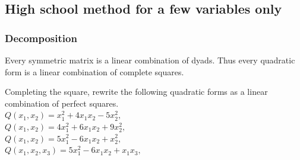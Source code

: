 \subsection{High school method for a few variables only}
\begin{frame}
    \frametitle{Decomposition}
    \begin{theorem}
        Every symmetric matrix is a linear combination of dyads. Thus
        every quadratic form is a linear combination of complete squares.
    \end{theorem}
\begin{example}
    Completing the square, rewrite the following quadratic forms as a linear combination of perfect squares.\\
    $Q\left( x_1,x_2 \right)=x_1^2+4x_1x_2-5x_2^2,$\\
    $Q\left( x_1,x_2 \right)=4x_1^2+6x_1x_2+9x_2^2,$\\
    $Q\left( x_1,x_2 \right)=5x_1^2-6x_1x_2+x_2^2,$\\
    $Q\left( x_1,x_2,x_3 \right)=5x_1^2-6x_1x_2+x_1x_3,$\\
\end{example}
\end{frame}
